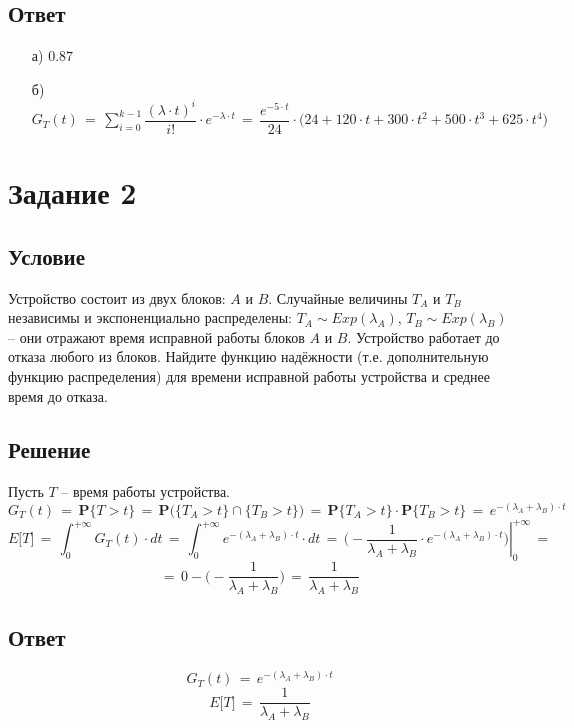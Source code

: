 \documentclass{article}
\begin{document}
\subsection*{Ответ}
\begin{enumerate}
\item[а)] $ 0.87 $
\item[б)] $ G_T(t) \, = \, \sum\limits_{i=0}^{k-1} \dfrac{(\lambda \! \cdot \! t)^i}{i!} \! \cdot \! e^{-\lambda \cdot t} \, = \, \dfrac{e^{-5 \cdot t}}{24} \! \cdot \! \big( 24 \! + \! 120 \! \cdot \! t \! + \! 300 \! \cdot \! t^2 \! + \! 500 \! \cdot \! t^3 \! + \! 625 \! \cdot \! t^4 \big) $
\end{enumerate}
\section*{Задание 2}
\subsection*{Условие} Устройство состоит из двух блоков: $ A $ и $ B $. Случайные величины $ T_A $ и $ T_B $ независимы и экспоненциально распределены: $ T_A \sim \! Exp(\lambda_A) $, $ T_B \! \sim \! Exp(\lambda_B) $ -- они отражают время исправной работы блоков $ A $ и $ B $. Устройство работает до отказа любого из блоков. Найдите функцию надёжности (т.е. дополнительную функцию распределения) для времени исправной работы устройства и среднее время до отказа.
\subsection*{Решение}
Пусть $ T $ -- время работы устройства.
\[ G_T(t) \, = \, \mathbf{P} \big\{ T \! > \! t \big\} \, = \, \mathbf{P} \bigg( \big\{ T_A \! > \! t \big\} \cap \big\{ T_B \! > \! t \big\} \bigg) \, = \, \mathbf{P} \big\{ T_A \! > \! t \big\} \! \cdot \! \mathbf{P} \big\{ T_B \! > \! t \big\} \, = \, e^{-(\lambda_A+\lambda_B) \cdot t} \]
\[ E \big[ T \big] \, = \, \int_0^{+\infty} G_T(t) \! \cdot \! dt \, = \, \int_0^{+\infty} e^{-(\lambda_A+\lambda_B) \cdot t} \! \cdot \! dt \, = \, \left. \Big( -\dfrac{1}{\lambda_A \! + \! \lambda_B} \! \cdot \! e^{-(\lambda_A+\lambda_B) \cdot t} \Big) \right|_0^{+\infty} \, = \]
\[ = \, 0 \! - \! \Big( -\dfrac{1}{\lambda_A \! + \! \lambda_B} \Big) \, = \, \dfrac{1}{\lambda_A \! + \! \lambda_B} \]
\subsection*{Ответ}
\[ G_T(t) \, = \, e^{-(\lambda_A+\lambda_B) \cdot t} \]
\[ E \big[ T \big] \, = \, \dfrac{1}{\lambda_A \! + \! \lambda_B} \]
\end{document}
